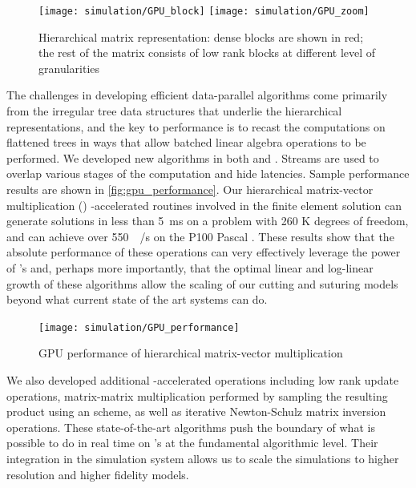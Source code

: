 \begin{figure}
  \centering%
	\texttt{[image: simulation/GPU\_block]}\vspace{2ex}
	\texttt{[image: simulation/GPU\_zoom]}\\
	\caption{Hierarchical matrix representation: dense blocks are shown in red; the rest of the matrix consists of low rank blocks at different level of granularities}
	\label{fig:gpu_matrix}
\end{figure}

The challenges in developing efficient data-parallel  algorithms come primarily from the irregular tree data structures that underlie the hierarchical representations, and the key to performance is to recast the computations on flattened trees in ways that allow batched linear algebra operations to be performed. We developed new  algorithms in both  and . Streams are used to overlap various stages of the computation and hide latencies. Sample performance results are shown in \autoref{fig:gpu_performance}. Our hierarchical matrix-vector multiplication
() -accelerated routines involved in the finite element solution can generate solutions in less than \SI{5}{\milli\second} on a problem with 260 K degrees of freedom, and can achieve over \SI{550}{\giga\byte/\second} on the P100 Pascal . These results show that the absolute performance of these operations can very effectively leverage the power of 's and, perhaps more importantly, that the optimal linear and log-linear growth of these algorithms allow the scaling of our cutting and suturing models beyond what current state of the art systems can do.

\begin{figure}
  \centering%
	\texttt{[image: simulation/GPU\_performance]}
	\caption{GPU performance of hierarchical matrix-vector multiplication}
	\label{fig:gpu_performance}
\end{figure}

We also developed additional -accelerated operations including low rank update operations, matrix-matrix multiplication performed by sampling the resulting product using an  scheme,  as well as iterative Newton-Schulz matrix inversion operations.  These state-of-the-art algorithms push the boundary of what is possible to do in real time on 's at the fundamental algorithmic level. Their integration in the simulation system allows us to scale the simulations to higher resolution and higher fidelity models.

